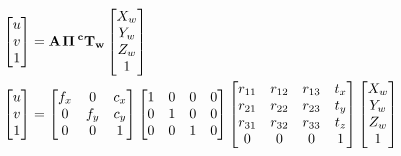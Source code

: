 \documentclass{article}
\begin{document}
\[ \begin{align*} \begin{bmatrix} u \\ v \\ 1 \end{bmatrix} &= \bf{A} \hspace{0.1em} \Pi \hspace{0.2em} ^{c}\bf{T}_w \begin{bmatrix} X_{w} \\ Y_{w} \\ Z_{w} \\ 1 \end{bmatrix} \\ \begin{bmatrix} u \\ v \\ 1 \end{bmatrix} &= \begin{bmatrix} f_x & 0 & c_x \\ 0 & f_y & c_y \\ 0 & 0 & 1 \end{bmatrix} \begin{bmatrix} 1 & 0 & 0 & 0 \\ 0 & 1 & 0 & 0 \\ 0 & 0 & 1 & 0 \end{bmatrix} \begin{bmatrix} r_{11} & r_{12} & r_{13} & t_x \\ r_{21} & r_{22} & r_{23} & t_y \\ r_{31} & r_{32} & r_{33} & t_z \\ 0 & 0 & 0 & 1 \end{bmatrix} \begin{bmatrix} X_{w} \\ Y_{w} \\ Z_{w} \\ 1 \end{bmatrix} \end{align*} \]
\pagebreak
\end{document}

